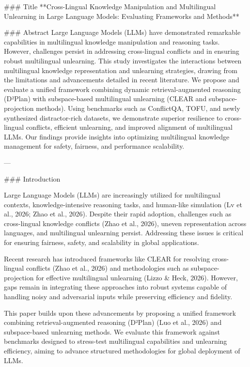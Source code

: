 ### Title  
**Cross-Lingual Knowledge Manipulation and Multilingual Unlearning in Large Language Models: Evaluating Frameworks and Methods**

### Abstract  
Large Language Models (LLMs) have demonstrated remarkable capabilities in multilingual knowledge manipulation and reasoning tasks. However, challenges persist in addressing cross-lingual conflicts and in ensuring robust multilingual unlearning. This study investigates the interactions between multilingual knowledge representation and unlearning strategies, drawing from the limitations and advancements detailed in recent literature. We propose and evaluate a unified framework combining dynamic retrieval-augmented reasoning (D²Plan) with subspace-based multilingual unlearning (CLEAR and subspace-projection methods). Using benchmarks such as ConflictQA, TOFU, and newly synthesized distractor-rich datasets, we demonstrate superior resilience to cross-lingual conflicts, efficient unlearning, and improved alignment of multilingual LLMs. Our findings provide insights into optimizing multilingual knowledge management for safety, fairness, and performance scalability.

---

### Introduction  

Large Language Models (LLMs) are increasingly utilized for multilingual contexts, knowledge-intensive reasoning tasks, and human-like simulation (Lv et al., 2026; Zhao et al., 2026). Despite their rapid adoption, challenges such as cross-lingual knowledge conflicts (Zhao et al., 2026), uneven representation across languages, and multilingual unlearning persist. Addressing these issues is critical for ensuring fairness, safety, and scalability in global applications.  

Recent research has introduced frameworks like CLEAR for resolving cross-lingual conflicts (Zhao et al., 2026) and methodologies such as subspace-projection for effective multilingual unlearning (Lizzo & Heck, 2026). However, gaps remain in integrating these approaches into robust systems capable of handling noisy and adversarial inputs while preserving efficiency and fidelity.  

This paper builds upon these advancements by proposing a unified framework combining retrieval-augmented reasoning (D²Plan) (Luo et al., 2026) and subspace-based unlearning methods. We evaluate this framework against benchmarks designed to stress-test multilingual capabilities and unlearning efficiency, aiming to advance structured methodologies for global deployment of LLMs.

